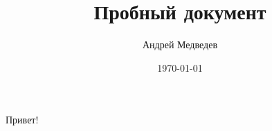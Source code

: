 \documentclass[a4paper]{article}
\author{Андрей Медведев}
\title{Пробный документ}
\date{\today}
\begin{document}
	\maketitle
	
	Привет!
	
	
\end{document}
